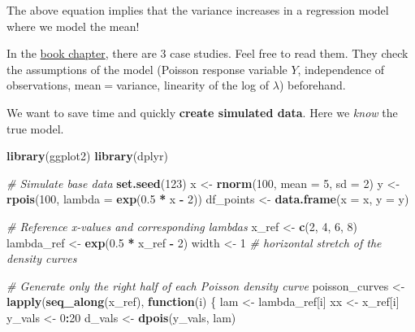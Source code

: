 \documentclass[
]{book}
\newenvironment{Shaded}{\begin{snugshade}}{\end{snugshade}}
\newcommand{\AttributeTok}[1]{\textcolor[rgb]{0.13,0.29,0.53}{#1}}
\newcommand{\CommentTok}[1]{\textcolor[rgb]{0.56,0.35,0.01}{\textit{#1}}}
\newcommand{\ControlFlowTok}[1]{\textcolor[rgb]{0.13,0.29,0.53}{\textbf{#1}}}
\newcommand{\DecValTok}[1]{\textcolor[rgb]{0.00,0.00,0.81}{#1}}
\newcommand{\FloatTok}[1]{\textcolor[rgb]{0.00,0.00,0.81}{#1}}
\newcommand{\FunctionTok}[1]{\textcolor[rgb]{0.13,0.29,0.53}{\textbf{#1}}}
\newcommand{\NormalTok}[1]{#1}
\newcommand{\OtherTok}[1]{\textcolor[rgb]{0.56,0.35,0.01}{#1}}
\newcommand{\SpecialCharTok}[1]{\textcolor[rgb]{0.81,0.36,0.00}{\textbf{#1}}}
\begin{document}
The above equation implies that the variance increases in a regression model
where we model the mean!

In the \href{https://bookdown.org/roback/bookdown-BeyondMLR/ch-poissonreg.html}{book chapter},
there are 3 case studies. Feel free to read them.
They check the assumptions of the model
(Poisson response variable \(Y\), independence of observations, mean\(=\)variance,
linearity of the log of \(\lambda\)) beforehand.

We want to save time and quickly \textbf{create simulated data}. Here we \emph{know}
the true model.

\begin{Shaded}
\begin{Highlighting}[]
\FunctionTok{library}\NormalTok{(ggplot2)}
\FunctionTok{library}\NormalTok{(dplyr)}

\CommentTok{\# Simulate base data}
\FunctionTok{set.seed}\NormalTok{(}\DecValTok{123}\NormalTok{)}
\NormalTok{x }\OtherTok{\textless{}{-}} \FunctionTok{rnorm}\NormalTok{(}\DecValTok{100}\NormalTok{, }\AttributeTok{mean =} \DecValTok{5}\NormalTok{, }\AttributeTok{sd =} \DecValTok{2}\NormalTok{)}
\NormalTok{y }\OtherTok{\textless{}{-}} \FunctionTok{rpois}\NormalTok{(}\DecValTok{100}\NormalTok{, }\AttributeTok{lambda =} \FunctionTok{exp}\NormalTok{(}\FloatTok{0.5} \SpecialCharTok{*}\NormalTok{ x }\SpecialCharTok{{-}} \DecValTok{2}\NormalTok{))}
\NormalTok{df\_points }\OtherTok{\textless{}{-}} \FunctionTok{data.frame}\NormalTok{(}\AttributeTok{x =}\NormalTok{ x, }\AttributeTok{y =}\NormalTok{ y)}

\CommentTok{\# Reference x{-}values and corresponding lambdas}
\NormalTok{x\_ref }\OtherTok{\textless{}{-}} \FunctionTok{c}\NormalTok{(}\DecValTok{2}\NormalTok{, }\DecValTok{4}\NormalTok{, }\DecValTok{6}\NormalTok{, }\DecValTok{8}\NormalTok{)}
\NormalTok{lambda\_ref }\OtherTok{\textless{}{-}} \FunctionTok{exp}\NormalTok{(}\FloatTok{0.5} \SpecialCharTok{*}\NormalTok{ x\_ref }\SpecialCharTok{{-}} \DecValTok{2}\NormalTok{)}
\NormalTok{width }\OtherTok{\textless{}{-}} \DecValTok{1}  \CommentTok{\# horizontal stretch of the density curves}

\CommentTok{\# Generate only the right half of each Poisson density curve}
\NormalTok{poisson\_curves }\OtherTok{\textless{}{-}} \FunctionTok{lapply}\NormalTok{(}\FunctionTok{seq\_along}\NormalTok{(x\_ref), }\ControlFlowTok{function}\NormalTok{(i) \{}
\NormalTok{  lam }\OtherTok{\textless{}{-}}\NormalTok{ lambda\_ref[i]}
\NormalTok{  xx }\OtherTok{\textless{}{-}}\NormalTok{ x\_ref[i]}
\NormalTok{  y\_vals }\OtherTok{\textless{}{-}} \DecValTok{0}\SpecialCharTok{:}\DecValTok{20}
\NormalTok{  d\_vals }\OtherTok{\textless{}{-}} \FunctionTok{dpois}\NormalTok{(y\_vals, lam)}
  

\end{Highlighting}
\end{Shaded}
\end{document}
